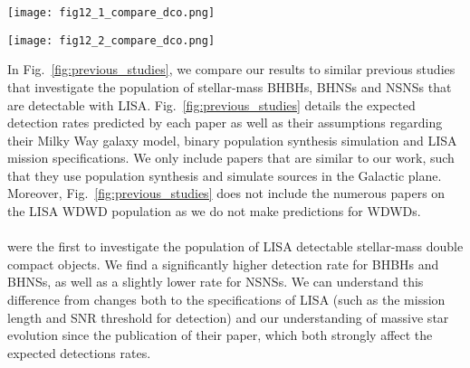 \begin{figure*}[p]
    \centering
    \texttt{[image: fig12\_1\_compare\_dco.png]}

    \vspace{0.5cm}

    \texttt{[image: fig12\_2\_compare\_dco.png]}
    \caption{A table comparing previous studies of a similar nature to this work. In the detection rate section darker shades of blue indicate higher detection rates. In other sections, darker shades of green indicate more detailed models or more accurate choices. Entries in detection rates with two values listed correspond to the different mission lengths (penultimate column). The works listed in the table are \citet{Nelemans+2001}, \citet{Belczynski+2010}, \citet{Liu+2014}, \citet{Lamberts+2018}, \citet{Sesana+2020}, \citet{Lau+2020}, \citet{Breivik+2020} and \citet{Shao+2021}. \href{https://github.com/TomWagg/detecting-DCOs-in-LISA/blob/main/paper/figures/fig12_1_compare_dco.png}{\faFileImage} \href{https://github.com/TomWagg/detecting-DCOs-in-LISA/blob/main/paper/figures/fig12_2_compare_dco.png}{\faFileImage} \href{https://github.com/TomWagg/detecting-DCOs-in-LISA/blob/main/paper/previous_BH_NS_studies.xlsx}{\faFileExcel}.}
    \label{fig:previous_studies}
\end{figure*}

In Fig.~\ref{fig:previous_studies}, we compare our results to similar previous studies that investigate the population of stellar-mass BHBHs, BHNSs and NSNSs that are detectable with LISA. Fig.~\ref{fig:previous_studies} details the expected detection rates predicted by each paper as well as their assumptions regarding their Milky Way galaxy model, binary population synthesis simulation and LISA mission specifications. We only include papers that are similar to our work, such that they use population synthesis and simulate sources in the Galactic plane. Moreover, Fig.~\ref{fig:previous_studies} does not include the numerous papers on the LISA WDWD population as we do not make predictions for WDWDs.
 
\paragraph{\citet{Nelemans+2001}} were the first to investigate the population of LISA detectable stellar-mass double compact objects. We find a significantly higher detection rate for BHBHs and BHNSs, as well as a slightly lower rate for NSNSs. We can understand this difference from changes both to the specifications of LISA (such as the mission length and SNR threshold for detection) and our understanding of massive star evolution since the publication of their paper, which both strongly affect the expected detections rates.

